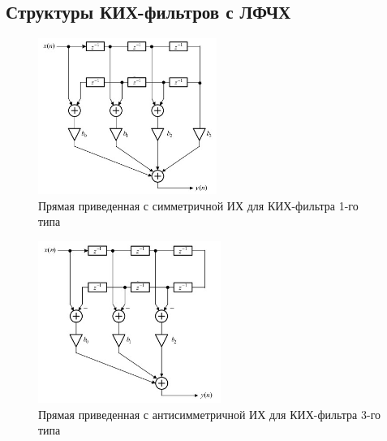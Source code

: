 \documentclass[a4paper, 14pt]{extarticle}
\begin{document}
\clearpage
\subsection{Структуры КИХ-фильтров с ЛФЧХ}
\begin{figure}[h]
    \centering
    \includegraphics[width=0.52\textwidth]{img/S010.jpg}
    \caption{Прямая приведенная с симметричной ИХ для КИХ-фильтра 1-го типа}%
\end{figure}

\begin{figure}[h]
    \centering
    \includegraphics[width=0.53\textwidth]{img/S011.jpg}
    \caption{Прямая приведенная с антисимметричной ИХ для КИХ-фильтра 3-го типа}%
\end{figure}
\FloatBarrier{}
\end{document}
